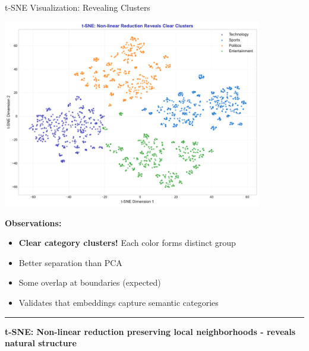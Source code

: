 \documentclass[8pt,aspectratio=169]{beamer}
\newcommand{\bottomnote}[1]{%
\vfill
\vspace{-2mm}
\textcolor{mllavender2}{\rule{\textwidth}{0.4pt}}
\vspace{1mm}
\footnotesize
\textbf{#1}
}
\begin{document}
\begin{frame}[t]{t-SNE Visualization: Revealing Clusters}

\begin{center}
\includegraphics[width=0.85\textwidth,height=0.7\textheight]{charts/tsne_visualization.pdf}
\end{center}

\textbf{Observations:}
\begin{itemize}
    \item \textbf{Clear category clusters!} Each color forms distinct group
    \item Better separation than PCA
    \item Some overlap at boundaries (expected)
    \item Validates that embeddings capture semantic categories
\end{itemize}

\bottomnote{t-SNE: Non-linear reduction preserving local neighborhoods - reveals natural structure}
\end{frame}
\end{document}
